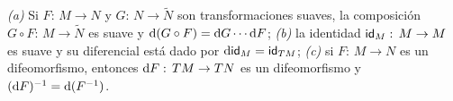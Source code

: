 \begin{propoElDiferencialFuntorial}\label{thm:eldiferencialfuntorial}
	\emph{(a)} Si $F:\,M\rightarrow N$ y $G:\,N\rightarrow\tilde{N}$ son
	transformaciones suaves, la composici\'{o}n
	$G\circ F:\,M\rightarrow\tilde{N}$ es suave y
	$\diferencial{(G\circ F)}=\diferencial{G}\cdots\diferencial{F}$;
	\emph{(b)} la identidad $\id[M]:\,M\rightarrow M$ es suave y su
	diferencial est\'{a} dado por $\diferencial{\id[M]}=\id[TM]$;
	\emph{(c)} si $F:\,M\rightarrow N$ es un difeomorfismo, entonces
	$\diferencial{F}:\,TM\rightarrow TN$ es un difeomorfismo y
	$(\diferencial{F})^{-1}=\diferencial{(F^{-1})}$.
\end{propoElDiferencialFuntorial}
